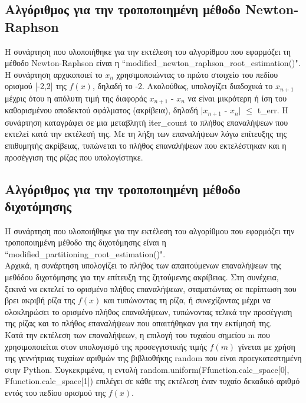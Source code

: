 \documentclass[a4paper,11pt]{article}
\newcommand{\lt}{\latintext}
\begin{document}
\subsection*{Αλγόριθμος για την τροποποιημένη μέθοδο {\lt Newton-Raphson }}
Η συνάρτηση που υλοποιήθηκε για την εκτέλεση του αλγορίθμου που εφαρμόζει τη μέθοδο {\lt Newton-Raphson } είναι η {\lt ``modified\_newton\_raphson\_root\_estimation()"}.\\
Η συνάρτηση αρχικοποιεί το {$x_{n}$} χρησιμοποιώντας το πρώτο στοιχείο του πεδίου ορισμού [-2,2] της {\lt $f(x)$}, δηλαδή το -2. Ακολούθως, υπολογίζει διαδοχικά το  {$x_{n+1}$} μέχρις ότου
η απόλυτη τιμή της διαφοράς {$x_{n+1}$} - {$x_{n}$} να είναι μικρότερη ή ίση του καθορισμένου αποδεκτού σφάλματος (ακρίβεια), δηλαδή $|${$x_{n+1}$} - {$x_{n}$}$|$ {$\leq$} {\lt t\_err}. Η συνάρτηση καταγράφει σε 	μια μεταβλητή {\lt iter\_count} το πλήθος επαναλήψεων που εκτελεί κατά την εκτέλεσή της. Με τη λήξη των επαναλήψεων λόγω επίτευξης της επιθυμητής ακρίβειας, τυπώνεται το πλήθος επαναλήψεων που 				εκτελέστηκαν και η προσέγγιση της ρίζας που υπολογίστηκε.
\subsection*{Αλγόριθμος για την τροποποιημένη μέθοδο διχοτόμησης}
Η συνάρτηση που υλοποιήθηκε για την εκτέλεση του αλγορίθμου που εφαρμόζει την τροποποιημένη μέθοδο της διχοτόμησης είναι η {\lt ``modified\_partitioning\_root\_estimation()"}. \\
Αρχικά, η συνάρτηση υπολογίζει το πλήθος των απαιτούμενων επαναλήψεων της μεθόδου διχοτόμησης για την επίτευξη της ζητούμενης ακρίβειας.  Στη συνέχεια, ξεκινά να εκτελεί το ορισμένο πλήθος επαναλήψεων, 		σταματώντας σε περίπτωση που βρει ακριβή ρίζα της {\lt$f(x)$} και τυπώνοντας τη ρίζα, ή συνεχίζοντας μέχρι να ολοκληρώσει το ορισμένο πλήθος επαναλήψεων, τυπώνοντας τελικά την προσέγγιση της ρίζας και το 			πλήθος επαναλήψεων που απαιτήθηκαν για την εκτίμησή της. \\
Κατά την εκτέλεση των επαναλήψεων, η επιλογή του τυχαίου σημείου {\lt m} που χρησιμοποιείται στον υπολογισμό της προσεγγιστικής τιμής {\lt $f(m)$} γίνεται με χρήση της γεννήτριας τυχαίων αριθμών της βιβλιοθήκης {\lt random} που είναι προεγκατεστημένη στην {\lt Python}. Συγκεκριμένα, η εντολή {\lt random.uniform(Ffunction.calc\_space[0], Ffunction.calc\_space[1])} επιλέγει σε κάθε της εκτέλεση έναν τυχαίο δεκαδικό αριθμό εντός του πεδίου ορισμού της {$f(x)$}.
\end{document}
